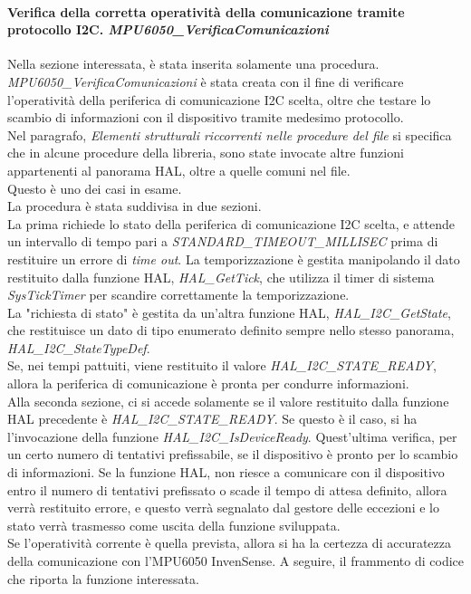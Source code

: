 \paragraph{Verifica della corretta operatività della comunicazione tramite protocollo I2C. \textit{MPU6050\_VerificaComunicazioni}}
Nella sezione interessata, è stata inserita solamente una procedura. \textit{MPU6050\_VerificaComunicazioni} è stata creata con il fine di verificare l'operatività della periferica di comunicazione I2C scelta, oltre che testare lo scambio di informazioni con il dispositivo tramite medesimo protocollo.\\
Nel paragrafo, \textit{Elementi strutturali riccorrenti nelle procedure del file} si specifica che in alcune procedure della libreria, sono state invocate altre funzioni appartenenti al panorama HAL, oltre a quelle comuni nel file.\\
Questo è uno dei casi in esame.\\
La procedura è stata suddivisa in due sezioni.\\
La prima richiede lo stato della periferica di comunicazione I2C scelta, e attende un intervallo di tempo pari a \textit{STANDARD\_TIMEOUT\_MILLISEC} prima di restituire un errore di \textit{time out}. La temporizzazione è gestita manipolando il dato restituito dalla funzione HAL, \textit{HAL\_GetTick}, che utilizza il timer di sistema \textit{SysTickTimer} per scandire correttamente la temporizzazione.\\
La "richiesta di stato" è gestita da un'altra funzione HAL, \textit{HAL\_I2C\_GetState}, che restituisce un dato di tipo enumerato definito sempre nello stesso panorama, \textit{HAL\_I2C\_StateTypeDef}.\\
Se, nei tempi pattuiti, viene restituito il valore \textit{HAL\_I2C\_STATE\_READY}, allora la periferica di comunicazione è pronta per condurre informazioni.\\
Alla seconda sezione, ci si accede solamente se il valore restituito dalla funzione HAL precedente è \textit{HAL\_I2C\_STATE\_READY}. Se questo è il caso, si ha l'invocazione della funzione \textit{HAL\_I2C\_IsDeviceReady}. Quest'ultima verifica, per un certo numero di tentativi prefissabile, se il dispositivo è pronto per lo scambio di informazioni. Se la funzione HAL, non riesce a comunicare con il dispositivo entro il numero di tentativi prefissato o scade il tempo di attesa definito, allora verrà restituito errore, e questo verrà segnalato dal gestore delle eccezioni e lo stato verrà trasmesso come uscita della funzione sviluppata.\\
Se l'operatività corrente è quella prevista, allora si ha la certezza di accuratezza della comunicazione con l'MPU6050 InvenSense.
A seguire, il frammento di codice che riporta la funzione interessata.


